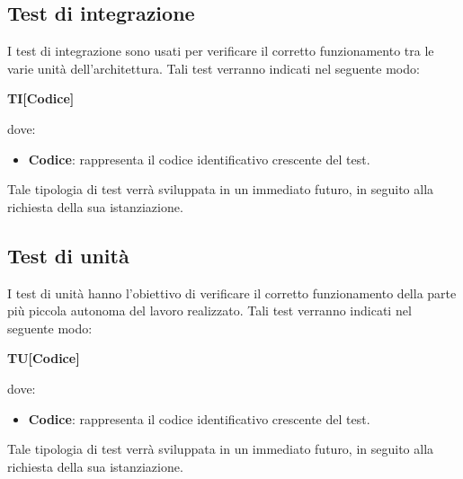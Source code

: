 \subsection{Test di integrazione}
I test di integrazione sono usati per verificare il corretto funzionamento tra le varie unità dell'architettura. Tali test verranno indicati nel seguente modo:\\
	\centerline{\textbf{TI[Codice]}}
dove:
\begin{itemize}
	\item \textbf{Codice}: rappresenta il codice identificativo crescente del test.
\end{itemize}
Tale tipologia di test verrà sviluppata in un immediato futuro, in seguito alla richiesta della sua istanziazione.

\subsection{Test di unità}
I test di unità hanno l'obiettivo di verificare il corretto funzionamento della parte più piccola autonoma del lavoro realizzato. Tali test verranno indicati nel seguente modo:\\
	\centerline{\textbf{TU[Codice]}}
dove:
\begin{itemize}
	\item \textbf{Codice}: rappresenta il codice identificativo crescente del test.
\end{itemize}
Tale tipologia di test verrà sviluppata in un immediato futuro, in seguito alla richiesta della sua istanziazione.
